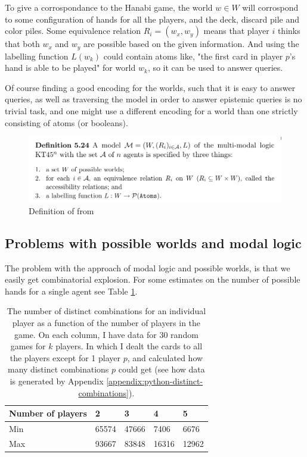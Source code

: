 To give a corrospondance to the Hanabi game, the world $w \in W$ will corrospond to some configuration of hands for all the players, and the deck, discard pile and color piles. Some equivalence relation $R_i = (w_x,w_y)$ means that player $i$ thinks that both $w_x$ and $w_y$ are possible based on the given information. And using the labelling function $L(w_k)$ could contain atoms like, "the first card in player $p$'s hand is able to be played" for world $w_k$, so it can be used to answer queries. 

Of course finding a good encoding for the worlds, such that it is easy to answer queries, as well as traversing the model in order to answer epistemic queries is no trivial task, and one might use a different encoding for a world than one strictly consisting of atoms (or booleans).





\begin{figure}
	\centering
\includegraphics[width=13cm,frame]{images/kt45n-definition.png}
	\caption{Definition of \KTfourfiveN from \cite{HuthAndRyan2004KT45n}}
	\label{fig:kt45n-definition}
\end{figure}




\subsection{Problems with possible worlds and modal logic}
The problem with the approach of modal logic and possible worlds, is that we easily get combinatorial explosion. 
For some estimates on the number of possible hands for a single agent see Table \ref{table:combinations}.

\begin{table}
	\centering
\begin{tabular}{l|llll}
Number of players & 2       & 3       & 4       & 5      \\\hline
Min               & 65574   & 47666   & 7406    & 6676   \\
Max               & 93667   & 83848   & 16316   & 12962 
\end{tabular}
	\caption{The number of distinct combinations for an individual player as a function of the number of players in the game. On each column, I have data for 30 random games for $k$ players. In which I dealt the cards to all the players except for 1 player $p$, and calculated how many distinct combinations $p$ could get (see how data is generated by Appendix \ref{appendix:python-distinct-combinations}).}
	\label{table:combinations}
\end{table}


